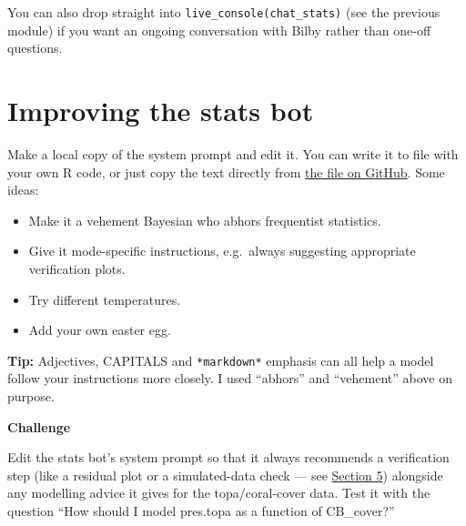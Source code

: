 \documentclass[
  letterpaper,
  DIV=11,
  numbers=noendperiod]{scrreprt}
\providecommand{\tightlist}{%
  \setlength{\itemsep}{0pt}\setlength{\parskip}{0pt}}
\begin{document}
You can also drop straight into \texttt{live\_console(chat\_stats)} (see
the previous module) if you want an ongoing conversation with Bilby
rather than one-off questions.

\section{Improving the stats bot}\label{improving-the-stats-bot}

Make a local copy of the system prompt and edit it. You can write it to
file with your own R code, or just copy the text directly from
\href{https://raw.githubusercontent.com/cbrown5/AI-assistants-for-scientific-coding/refs/heads/main/resources/DIY-stats-bot-system.md}{the
file on GitHub}. Some ideas:

\begin{itemize}
\tightlist
\item
  Make it a vehement Bayesian who abhors frequentist statistics.
\item
  Give it mode-specific instructions, e.g.~always suggesting appropriate
  verification plots.
\item
  Try different temperatures.
\item
  Add your own easter egg.
\end{itemize}

\textbf{Tip:} Adjectives, CAPITALS and \texttt{*markdown*} emphasis can
all help a model follow your instructions more closely. I used
``abhors'' and ``vehement'' above on purpose.

\begin{tcolorbox}[enhanced jigsaw, toprule=.15mm, rightrule=.15mm, left=2mm, leftrule=.75mm, breakable, opacityback=0, arc=.35mm, colframe=quarto-callout-important-color-frame, bottomrule=.15mm, colback=white]
\begin{minipage}[t]{5.5mm}
\textcolor{quarto-callout-important-color}{\faExclamation}
\end{minipage}%
\begin{minipage}[t]{\textwidth - 5.5mm}

\vspace{-3mm}\textbf{Challenge}\vspace{3mm}

Edit the stats bot's system prompt so that it always recommends a
verification step (like a residual plot or a simulated-data check ---
see \hyperref[section-5-agentic-engineering-for-data-analysis]{Section
5}) alongside any modelling advice it gives for the topa/coral-cover
data. Test it with the question ``How should I model pres.topa as a
function of CB\_cover?''

\end{minipage}%
\end{tcolorbox}
\end{document}
